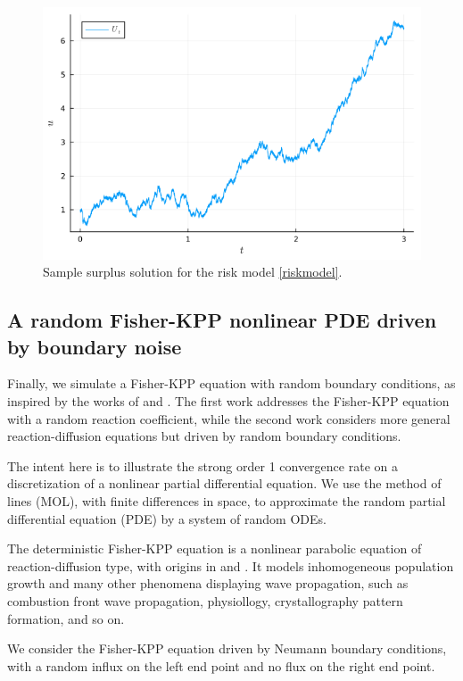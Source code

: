 \documentclass[reqno,12pt]{amsart}
\theoremstyle{plain} %
\theoremstyle{definition} %
\begin{document}
\begin{figure}[htb]
    \includegraphics[scale=0.6]{img/riskmodel_surplus.png}
    \caption{Sample surplus solution for the risk model \eqref{riskmodel}.}
    \label{figriskmodelsurplus}
\end{figure}

\subsection{A random Fisher-KPP nonlinear PDE driven by boundary noise}

Finally, we simulate a Fisher-KPP equation with random boundary conditions, as inspired by the works of \cite{SalakoShen2020}  and \cite{FreidlinWentzell1992}. The first work addresses the Fisher-KPP equation with a random reaction coefficient, while the second work considers more general reaction-diffusion equations but driven by random boundary conditions.

The intent here is to illustrate the strong order 1 convergence rate on a discretization of a nonlinear partial differential equation. We use the method of lines (MOL), with finite differences in space, to approximate the random partial differential equation (PDE) by a system of random ODEs.

The deterministic Fisher-KPP equation is a nonlinear parabolic equation of reaction-diffusion type, with origins in \cite{Fisher1937} and \cite{KPP1937}. It models inhomogeneous population growth and many other phenomena displaying wave propagation, such as combustion front wave propagation, physiollogy, crystallography pattern formation, and so on.

We consider the Fisher-KPP equation driven by Neumann boundary conditions, with a random influx on the left end point and no flux on the right end point.
\end{document}
